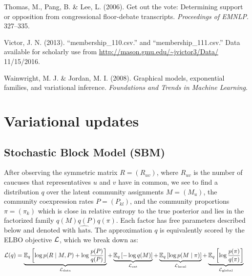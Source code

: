 \documentclass{article}
\begin{document}
\begin{thebibliography}{10}
 Thomas, M., Pang, B. \& Lee, L. (2006). Get out
the vote: Determining support or opposition from
congressional floor-debate transcripts. {\itshape Proceedings
of EMNLP}. 327–335.

 Victor, J. N.  (2013). ``membership\_110.csv.'' and ``membership\_111.csv.'' Data available for scholarly use from \url{http://mason.gmu.edu/~jvictor3/Data/} 11/15/2016.

 Wainwright, M. J. \& Jordan, M. I. (2008). Graphical models, exponential families, and variational inference. {\sl Foundations and Trends in Machine Learning}. 

\end{thebibliography}

\appendix

\newpage

\section{Variational updates}
\label{vi}
\subsection{Stochastic Block Model (SBM)}
\label{sbmvi}

After observing the symmetric matrix $R = (R_{uv})$, where $R_{uv}$ is the number of caucuses that representatives $u$ and $v$ have in common, we see to find a distribution $q$ over the latent community assignments $M = (M_u)$, the community coexpression rates $P = (P_{kl})$, and the community proportions $\pi = (\pi_k)$ which is close in relative entropy to the true posterior and lies in the factorized family $q(M)q(P)q(\pi)$. Each factor has free parameters described below and denoted with $\widehat{\text{hats}}$. The approximation $q$ is equivalently scored by the ELBO objective $\mathcal{L}$, which we break down as:%
\begin{equation*}
\begin{split}
\mathcal{L}(q)
&= \underbrace{\mathbb{E}_q\left[\log p(R\mid M,P)+ \log\frac{p(P)}{q(P)}\right]}_{\mathcal{L}_{\text{data}}}
+ \underbrace{\mathbb{E}_q\left[-\log q(M)\right]}_{\mathcal{L}_{\text{ent}}}
+ \underbrace{\mathbb{E}_q\left[\log p(M\mid \pi)\right]}_{\mathcal{L}_{\text{local}}}
+ \underbrace{\mathbb{E}_q\left[\log\frac{p(\pi)}{q(\pi)}\right]}_{\mathcal{L}_{\text{global}}}
\end{split}
\end{equation*}
~\vspace{-1em}
\end{document}
